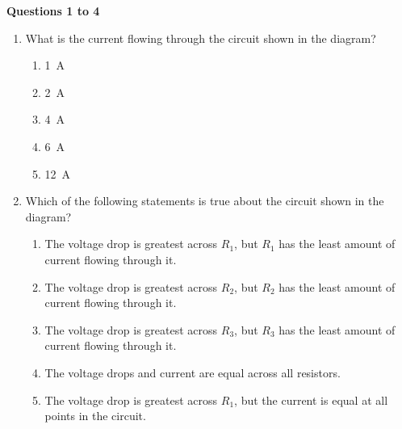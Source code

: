 \documentclass{../../oss-apphys}
\begin{document}
\genheader


\genmultidirections

\gengravity

\raggedcolumns
\begin{multicols}{2}

  \textbf{Questions 1 to 4}  
  \begin{center}
  \end{center}
  
  \begin{enumerate}[leftmargin=18pt]

  \item What is the current flowing through the circuit shown in the diagram?
    \begin{enumerate}[noitemsep,topsep=0pt,leftmargin=18pt,label=(\Alph*)]
    \item\SI{1}{A}
    \item\SI{2}{A}
    \item\SI{4}{A}
    \item\SI{6}{A}
    \item\SI{12}{A}
    \end{enumerate}
    
  \item Which of the following statements is true about the circuit shown in the
    diagram?
    \begin{enumerate}[noitemsep,topsep=0pt,leftmargin=18pt,label=(\Alph*)]  
    \item The voltage drop is greatest across $R_1$, but $R_1$ has the least
      amount of current flowing through it.
    \item The voltage drop is greatest across $R_2$, but $R_2$ has the least
      amount of current flowing through it.
    \item The voltage drop is greatest across $R_3$, but $R_3$ has the least
      amount of current flowing through it.
    \item The voltage drops and current are equal across all resistors.
    \item The voltage drop is greatest across $R_1$, but the current is equal at
      all points in the circuit.
    \end{enumerate}


\end{enumerate}
\end{multicols}
\end{document}
